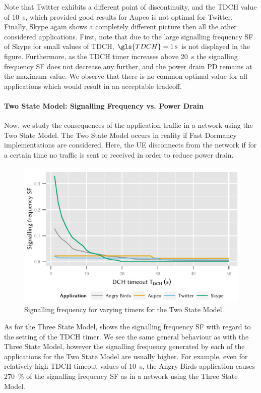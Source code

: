 Note that Twitter exhibits a different point of discontinuity, and the \gls{TDCH} value of \SI{10}{\second}, which provided good results for Aupeo is not optimal for Twitter.
Finally, Skype again shows a completely different picture then all the other considered applications.
First, note that due to the large signalling frequency \gls{SF} of Skype for small values of \gls{TDCH}, \(\gls{TDCH} = \SI{1}{\second}\) is not displayed in the figure.
Furthermore, as the \gls{TDCH} timer increases above \SI{20}{\second} the signalling frequency \gls{SF} does not decrease any further, and the power drain \gls{PD} remains at the maximum value.
We observe that there is no common optimal value for all applications which would result in an acceptable tradeoff.


\paragraph*{Two State Model: Signalling Frequency vs. Power Drain}\label{sec:network:network_traces:numerical_results:two_states}
Now, we study the consequences of the application traffic in a network using the Two State Model.
The Two State Model occurs in reality if Fast Dormancy implementations are considered.
Here, the \gls{UE} disconnects from the network if for a certain time no traffic is sent or received in order to reduce power drain.
\begin{figure}
	\centering
	\includegraphics{network/network_traces/numerical_results/figures/2_state_tdch_vs_frequency}
	\caption{Signalling frequency  for varying  timers for the Two State Model.}\label{fig:network:network_traces:numerical_results:two_states:signalling}
\end{figure}
As for the Three State Model,  shows the signalling frequency \gls{SF} with regard to the setting of the \gls{TDCH} timer.
We see the same general behaviour as with the Three State Model, however the signalling frequency generated by each of the applications for the Two State Model are usually higher.
For example, even for relatively high \gls{TDCH} timeout values of \SI{10}{\second}, the Angry Birds application causes \SI{270}{\percent} of the signalling frequency \gls{SF} as in a network using the Three State Model.

